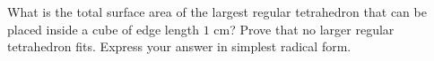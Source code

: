What is the total surface area of the largest regular tetrahedron that can be placed inside a cube of edge length $1$ cm? Prove that no larger regular tetrahedron fits. Express your answer in simplest radical form.

